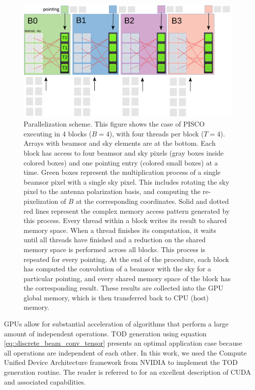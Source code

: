 \documentclass[a4paper,11pt]{article}
\begin{document}
\begin{figure}
	\begin{center}
		\includegraphics[width=0.8\linewidth]{figures/PISCO-diagram.png}
		\caption{Parallelization scheme. This figure shows the case of PISCO executing in 4 blocks ($B=4$), with four threads per block ($T=4$). Arrays with beamsor and sky elements are at the bottom. Each block has access to four beamsor and sky pixels (gray boxes inside colored boxes) and one pointing entry (colored small boxes) at a time. Green boxes represent the multiplication process of a single beamsor pixel with a single sky pixel. This includes rotating the sky pixel to the antenna polarization basis, and computing the re-pixelization of $B$ at the corresponding coordinates. Solid and dotted red lines represent the complex memory access pattern generated by this process. Every thread within a block writes its result to shared memory space. When a thread finishes its computation, it waits until all threads have finished and a reduction on the shared memory space is performed across all blocks. This process is repeated for every pointing. At the end of the procedure, each block has computed the convolution of a beamsor with the sky for a particular pointing, and every shared memory space of the block has the corresponding result. These results are collected into the GPU global memory, which is then transferred back to CPU (host) memory.}
		\label{fig::pisco_diagram}
	\end{center}
\end{figure}

GPUs allow for substantial acceleration of algorithms that perform a large amount of independent operations. TOD generation using equation \ref{eq::discrete_beam_conv_tensor} presents an optimal application case because all operations are independent of each other. In this work, we used the Compute Unified Device Architecture framework from NVIDIA to implement the TOD generation routine. The reader is referred to \cite{sanders2010cuda} for an excellent description of CUDA and associated capabilities.
\end{document}
